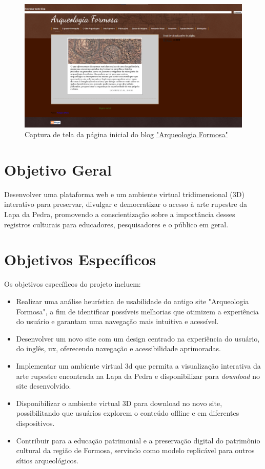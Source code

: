 \begin{figure}
    \centering
    \includegraphics[width=1\linewidth]{images/home-blog-print.png}
    \caption{Captura de tela da página inicial do blog \href{https://arqueologiaformosa.blogspot.com/}{"Arqueologia Formosa"}}
    \label{fig:Captura de tela da página inicial do blog}
\end{figure}

\section{Objetivo Geral}
Desenvolver uma plataforma web e um ambiente virtual tridimensional (3D) interativo para preservar, divulgar e democratizar o acesso à arte rupestre da Lapa da Pedra, promovendo a conscientização sobre a importância desses registros culturais para educadores, pesquisadores e o público em geral.

\section{Objetivos Específicos}
Os objetivos específicos do projeto incluem:
\begin{itemize}
    \item Realizar uma análise heurística de usabilidade do antigo site "Arqueologia Formosa", a fim de identificar possíveis melhorias que otimizem a experiência do usuário e garantam uma navegação mais intuitiva e acessível.
    \item Desenvolver um novo site com um design centrado na experiência do usuário, do inglês, \gls{ux}, oferecendo navegação e acessibilidade aprimoradas.
    \item Implementar um ambiente virtual \gls{3d} que permita a visualização interativa da arte rupestre encontrada na Lapa da Pedra e disponibilizar para \textit{download} no site desenvolvido.
    \item Disponibilizar o ambiente virtual 3D para download no novo site, possibilitando que usuários explorem o conteúdo offline e em diferentes dispositivos.
    \item Contribuir para a educação patrimonial e a preservação digital do patrimônio cultural da região de Formosa, servindo como modelo replicável para outros sítios arqueológicos.
\end{itemize}


